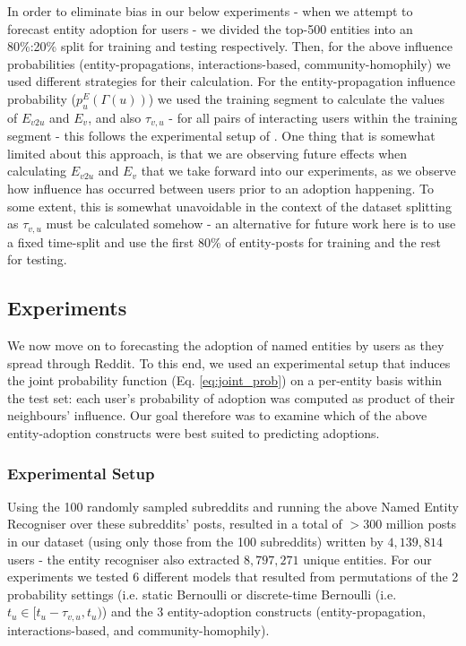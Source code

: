 \documentclass[10pt,journal,compsoc]{IEEEtran}
\begin{document}
In order to eliminate bias in our below experiments - when we attempt to forecast entity adoption for users - we divided the top-500 entities into an 80\%:20\% split for training and testing respectively.
Then, for the above influence probabilities (entity-propagations, interactions-based, community-homophily) we used different strategies for their calculation.
For the entity-propagation influence probability ($p^E_u(\Gamma(u))$) we used the training segment to calculate the values of $E_{v2u}$ and $E_v$, and also $\tau_{v,u}$ - for all pairs of interacting users within the training segment - this follows the experimental setup of \cite{goyal2010learning}.
One thing that is somewhat limited about this approach, is that we are observing future effects when calculating $E_{v2u}$ and $E_v$ that we take forward into our experiments, as we observe how influence has occurred between users prior to an adoption happening.
To some extent, this is somewhat unavoidable in the context of the dataset splitting as $\tau_{v,u}$ must be calculated somehow - an alternative for future work here is to use a fixed time-split and use the first 80\% of entity-posts for training and the rest for testing.

\subsection{Experiments}
We now move on to forecasting the adoption of named entities by users as they spread through Reddit.
To this end, we used an experimental setup that induces the joint probability function (Eq. \ref{eq:joint_prob}) on a per-entity basis within the test set: each user's probability of adoption was computed as product of their neighbours' influence.
Our goal therefore was to examine which of the above entity-adoption constructs were best suited to predicting adoptions.

\subsubsection{Experimental Setup}
Using the 100 randomly sampled subreddits and running the above Named Entity Recogniser over these subreddits' posts, resulted in a total of $>300$ million posts in our dataset (using only those from the 100 subreddits) written by $4,139,814$ users - the entity recogniser also extracted $8,797,271$ unique entities.
For our experiments we tested 6 different models that resulted from permutations of the 2 probability settings (i.e. static Bernoulli or discrete-time Bernoulli (i.e. $t_u \in [t_u - \tau_{v,u}, t_u)$) and the 3 entity-adoption constructs (entity-propagation, interactions-based, and community-homophily).
\end{document}
